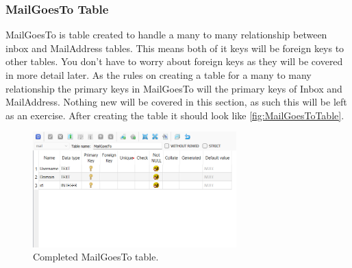 \documentclass[a4paper,11pt,oneside]{article}
\begin{document}
\begin{sloppypar}
\subsubsection{MailGoesTo Table}
\label{sqliteStudioMailGoesToTable}
MailGoesTo is table created to handle a many to many relationship between inbox and MailAddress tables. This means both of it keys will be foreign keys to other tables. You don't have to worry about foreign keys as they will be covered in more detail later. As the rules on creating a table for a many to many relationship the primary keys in MailGoesTo will the primary keys of Inbox and MailAddress. Nothing new will be covered in this section, as such this will be left as an exercise. After creating the table it should look like \autoref{fig:MailGoesToTable}. 
\begin{figure}[!htb]
  \centering
  \includegraphics[width=0.7\textwidth]{sqlitestudio/create_mail_goes_to/create_mail_goes_to.png}
  \caption{Completed MailGoesTo table.}
  \label{fig:MailGoesToTable}
\end{figure}

\end{sloppypar}
\end{document}
